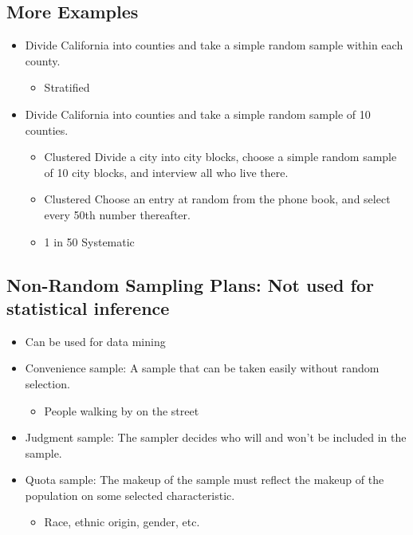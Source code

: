 \documentclass[]{article}
\begin{document}
\subsection{More Examples}\label{more-examples}

\begin{itemize}
\itemsep1pt\parskip0pt
\item
  Divide California into counties and take a simple random sample within
  each county.

  \begin{itemize}
  \itemsep1pt\parskip0pt
  \item
    Stratified
  \end{itemize}
\item
  Divide California into counties and take a simple random sample of 10
  counties.

  \begin{itemize}
  \itemsep1pt\parskip0pt
  \item
    Clustered Divide a city into city blocks, choose a simple random
    sample of 10 city blocks, and interview all who live there.
  \item
    Clustered Choose an entry at random from the phone book, and select
    every 50th number thereafter.
  \item
    1 in 50 Systematic
  \end{itemize}
\end{itemize}

\subsection{Non-Random Sampling Plans: Not used for statistical
inference}\label{non-random-sampling-plans-not-used-for-statistical-inference}

\begin{itemize}
\item
  Can be used for data mining
\item
  Convenience sample: A sample that can be taken easily without random
  selection.

  \begin{itemize}
  \itemsep1pt\parskip0pt
  \item
    People walking by on the street
  \end{itemize}
\item
  Judgment sample: The sampler decides who will and won't be included in
  the sample.\\
\item
  Quota sample: The makeup of the sample must reflect the makeup of the
  population on some selected characteristic.

  \begin{itemize}
  \itemsep1pt\parskip0pt
  \item
    Race, ethnic origin, gender, etc.
  \end{itemize}
\end{itemize}
\end{document}
